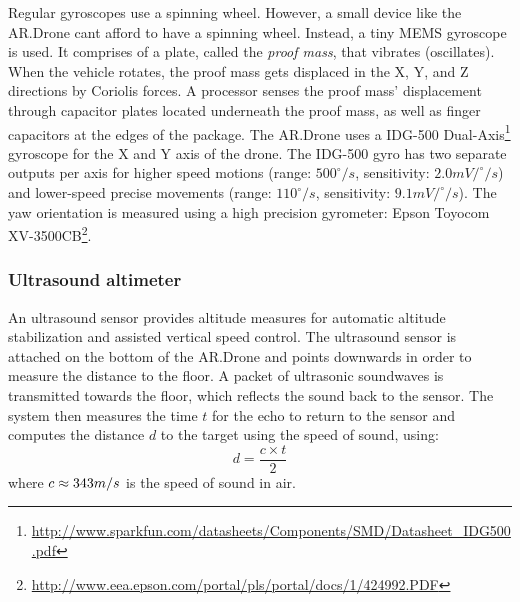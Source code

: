 Regular gyroscopes use a spinning wheel.
However, a small device like the AR.Drone cant afford to have a spinning wheel.
Instead, a tiny MEMS gyroscope is used. 
It comprises of a plate, called the \textit{proof mass}, that vibrates (oscillates).
When the vehicle rotates, the proof mass gets displaced in the X, Y, and Z directions by Coriolis forces.
A processor senses the proof mass’ displacement through capacitor plates located underneath the proof mass, as well as finger capacitors at the edges of the package.
The AR.Drone uses a IDG-500 Dual-Axis\footnote{\url{http://www.sparkfun.com/datasheets/Components/SMD/Datasheet_IDG500.pdf}} gyroscope for the X and Y axis of the drone.
The IDG-500 gyro has two separate outputs per axis for higher speed motions (range: $500^{\circ}/s$, sensitivity: $2.0mV/^{\circ}/s$) and lower-speed precise movements (range: $110^{\circ}/s$, sensitivity: $9.1mV/^{\circ}/s$).
The yaw orientation is measured using a high precision gyrometer: Epson Toyocom XV-3500CB\footnote{\url{http://www.eea.epson.com/portal/pls/portal/docs/1/424992.PDF}}.


\subsubsection{Ultrasound altimeter}
\label{sec:ultrasound_altimeter}
An ultrasound sensor provides altitude measures for automatic altitude stabilization and assisted vertical speed control.
The ultrasound sensor is attached on the bottom of the AR.Drone and points downwards in order to measure the distance to the floor.
A packet of ultrasonic soundwaves is transmitted towards the floor, which reflects the sound back to the sensor.
The system then measures the time $t$ for the echo to return to the sensor and computes the distance $d$ to the target using the speed of sound, using:
\begin{equation}
d = \frac{c \times t}{2}
\end{equation}
where $c \approx 343\small{m/s}$ is the speed of sound in air.

